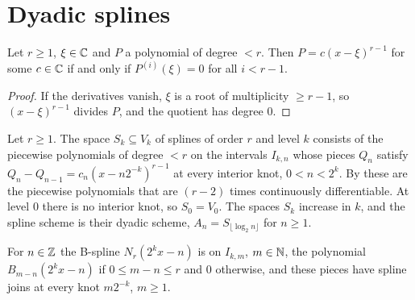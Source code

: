 \section{Dyadic splines}

\begin{lemma}
\label{lem:spline-joins}
\leanok
Let $r \geq 1$, $\xi \in \mathbb{C}$ and $P$ a polynomial of degree $< r$. Then
$P = c (x - \xi)^{r-1}$ for some $c \in \mathbb{C}$ if and only if $P^{(i)}(\xi) = 0$ for all $i < r - 1$.
\end{lemma}

\begin{proof}
\leanok
If the derivatives vanish, $\xi$ is a root of multiplicity $\geq r - 1$, so $(x - \xi)^{r-1}$
divides $P$, and the quotient has degree $0$.
\end{proof}

\begin{definition}
\label{def:spline-space}
\leanok
{}
Let $r \geq 1$. The space $S_k \subseteq V_k$ of splines of order $r$ and level $k$ consists of
the piecewise polynomials of degree $< r$ on the intervals $I_{k,n}$ whose pieces $Q_n$ satisfy
$Q_n - Q_{n-1} = c_n (x - n 2^{-k})^{r-1}$ at every interior knot, $0 < n < 2^k$. By
 these are the piecewise polynomials that are $(r-2)$ times continuously
differentiable. At level $0$ there is no interior knot, so $S_0 = V_0$. The spaces $S_k$ increase
in $k$, and the spline scheme is their dyadic scheme, $A_n = S_{\lfloor \log_2 n \rfloor}$ for
$n \geq 1$.
\end{definition}

\begin{lemma}
\label{lem:bspline-dyadic}
\leanok
{}
For $n \in \mathbb{Z}$ the B-spline $N_r(2^k x - n)$ is on $I_{k,m}$, $m \in \mathbb{N}$, the polynomial
$B_{m-n}(2^k x - n)$ if $0 \leq m - n \leq r$ and $0$ otherwise, and these pieces have spline
joins at every knot $m 2^{-k}$, $m \geq 1$.
\end{lemma}


